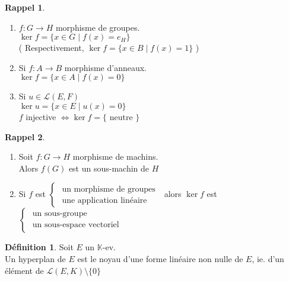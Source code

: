 \documentclass[10pt,a4paper]{article}
\theoremstyle{definition}
\newtheorem{definition}[proposition]{Définition}
\newtheorem*{rappel}{Rappel}
\begin{document}
\pagebreak

\begin{rappel}
\hfill
\begin{enumerate}
\item $f: G \to H$ morphisme de groupes. \\
$\ker f = \{ x \in G \mid f(x) = e_H \}$ \\
( Respectivement, $\ker f = \{ x \in B \mid f(x) = 1 \}$ )
\item Si $f: A \to B$ morphisme d'anneaux. \\
$\ker f = \{ x \in A \mid f(x) = 0 \}$
\item Si $u \in \mathcal{L}(E, F)$ \\
$\ker u = \{x \in E \mid u(x) = 0\}$ \\
$f$ injective $\iff \ker f = \{ \text{ neutre } \}$
\end{enumerate}
\end{rappel}
\begin{rappel}
\hfill
\begin{enumerate}
\item Soit $f: G \to H$ morphisme de machins\footnotemark[1]. \\
Alors $f(G)$ est un sous-machin de $H$
\item Si $f$ est $\begin{cases}
\text{ un morphisme de groupes } \\
\text{ une application linéaire} 
\end{cases}$ alors $\ker f$ est $\begin{cases}
\text{ un sous-groupe } \\
\text{ un sous-espace vectoriel} 
\end{cases}$
\end{enumerate}
\end{rappel}
\begin{definition}
Soit $E$ un $\mathbb{K}$-ev. \\
Un hyperplan de $E$ est le noyau d'une forme linéaire non nulle de $E$, ie. d'un élément de $\mathcal{L}(E, K) \setminus \{ 0 \}$
\end{definition}
\end{document}
